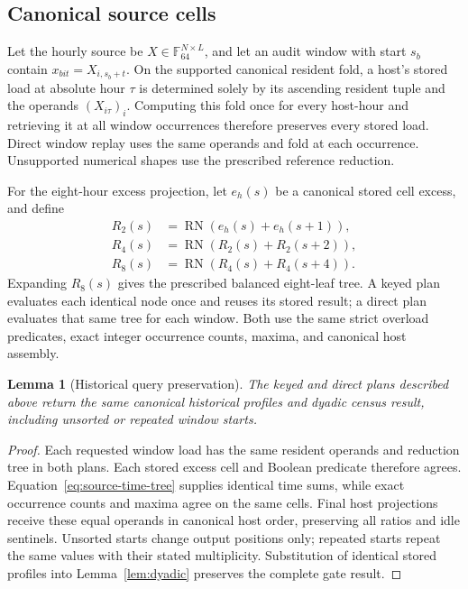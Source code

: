 \documentclass[11pt]{article}
\newtheorem{lemma}{Lemma}
\begin{document}
\subsection{Canonical source cells}
Let the hourly source be $X\in\mathbb F_{64}^{N\times L}$, and let an audit window with start $s_b$ contain $x_{bit}=X_{i,s_b+t}$. On the supported canonical resident fold, a host's stored load at absolute hour $\tau$ is determined solely by its ascending resident tuple and the operands $(X_{i\tau})_i$. Computing this fold once for every host-hour and retrieving it at all window occurrences therefore preserves every stored load. Direct window replay uses the same operands and fold at each occurrence. Unsupported numerical shapes use the prescribed reference reduction.

For the eight-hour excess projection, let $e_h(s)$ be a canonical stored cell excess, and define
\begin{align}
R_2(s)&=\operatorname{RN}(e_h(s)+e_h(s+1)),\nonumber\\
R_4(s)&=\operatorname{RN}(R_2(s)+R_2(s+2)),\nonumber\\
R_8(s)&=\operatorname{RN}(R_4(s)+R_4(s+4)).
\label{eq:source-time-tree}
\end{align}
Expanding $R_8(s)$ gives the prescribed balanced eight-leaf tree. A keyed plan evaluates each identical node once and reuses its stored result; a direct plan evaluates that same tree for each window. Both use the same strict overload predicates, exact integer occurrence counts, maxima, and canonical host assembly.

\begin{lemma}[Historical query preservation]\label{lem:historical-query}
The keyed and direct plans described above return the same canonical historical profiles and dyadic census result, including unsorted or repeated window starts.
\end{lemma}
\begin{proof}
Each requested window load has the same resident operands and reduction tree in both plans. Each stored excess cell and Boolean predicate therefore agrees. Equation~\eqref{eq:source-time-tree} supplies identical time sums, while exact occurrence counts and maxima agree on the same cells. Final host projections receive these equal operands in canonical host order, preserving all ratios and idle sentinels. Unsorted starts change output positions only; repeated starts repeat the same values with their stated multiplicity. Substitution of identical stored profiles into Lemma~\ref{lem:dyadic} preserves the complete gate result.
\end{proof}
\end{document}
